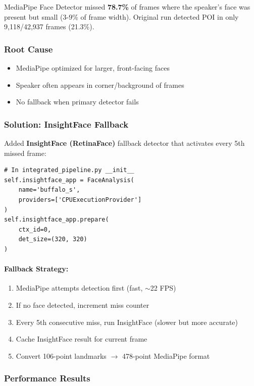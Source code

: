 \documentclass[11pt,a4paper]{article}
\begin{document}
MediaPipe Face Detector missed \textbf{78.7\%} of frames where the speaker's face was present but small (3-9\% of frame width). Original run detected POI in only 9,118/42,937 frames (21.3\%).

\subsubsection{Root Cause}

\begin{itemize}
    \item MediaPipe optimized for larger, front-facing faces
    \item Speaker often appears in corner/background of frames
    \item No fallback when primary detector fails
\end{itemize}

\subsubsection{Solution: InsightFace Fallback}

Added \textbf{InsightFace (RetinaFace)} fallback detector that activates every 5th missed frame:

\begin{lstlisting}[style=pythoncode]
# In integrated_pipeline.py __init__
self.insightface_app = FaceAnalysis(
    name='buffalo_s',
    providers=['CPUExecutionProvider']
)
self.insightface_app.prepare(
    ctx_id=0, 
    det_size=(320, 320)
)
\end{lstlisting}

\paragraph{Fallback Strategy:}
\begin{enumerate}
    \item MediaPipe attempts detection first (fast, $\sim$22 FPS)
    \item If no face detected, increment miss counter
    \item Every 5th consecutive miss, run InsightFace (slower but more accurate)
    \item Cache InsightFace result for current frame
    \item Convert 106-point landmarks $\rightarrow$ 478-point MediaPipe format
\end{enumerate}

\subsubsection{Performance Results}
\end{document}
